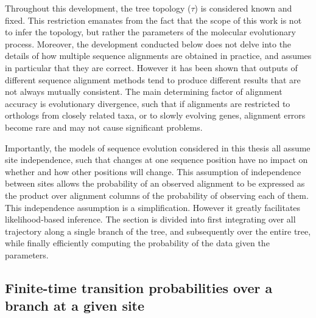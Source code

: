 Throughout this development, the tree topology ($\tau$) is considered known and fixed.
This restriction emanates from the fact that the scope of this work is not to infer the topology, but rather the parameters of the molecular evolutionary process.
Moreover, the development conducted below does not delve into the details of how multiple sequence alignments are obtained in practice, and assumes in particular that they are correct.
However it has been shown that outputs of different sequence alignment methods tend to produce different results that are not always mutually consistent.
The main determining factor of alignment accuracy is evolutionary divergence, such that if alignments are restricted to orthologs from closely related taxa, or to slowly evolving genes, alignment errors become rare and may not cause significant problems.

Importantly, the models of sequence evolution considered in this thesis all assume site independence, such that changes at one sequence position have no impact on whether and how other positions will change.
This assumption of independence between sites allows the probability of an observed alignment to be expressed as the product over alignment columns of the probability of observing each of them.
This independence assumption is a simplification.
However it greatly facilitates likelihood-based inference.
The section is divided into first integrating over all trajectory along a single branch of the tree, and subsequently over the entire tree, while finally efficiently computing the probability of the data given the parameters.

\subsection{Finite-time transition probabilities over a branch at a given site}

